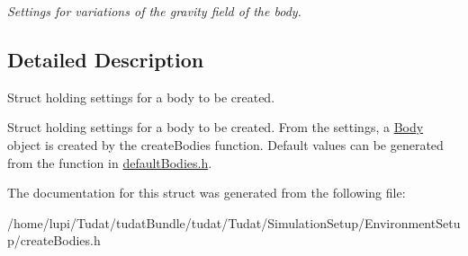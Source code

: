 \begin{DoxyCompactItemize}
\begin{DoxyCompactList}\small\item\em Settings for variations of the gravity field of the body. \end{DoxyCompactList}\end{DoxyCompactItemize}


\subsection{Detailed Description}
Struct holding settings for a body to be created. 

Struct holding settings for a body to be created. From the settings, a \hyperlink{classtudat_1_1simulation__setup_1_1Body}{Body} object is created by the create\+Bodies function. Default values can be generated from the function in \hyperlink{defaultBodies_8h_source}{default\+Bodies.\+h}. 

The documentation for this struct was generated from the following file\+:\begin{DoxyCompactItemize}
\item 
/home/lupi/\+Tudat/tudat\+Bundle/tudat/\+Tudat/\+Simulation\+Setup/\+Environment\+Setup/create\+Bodies.\+h\end{DoxyCompactItemize}
